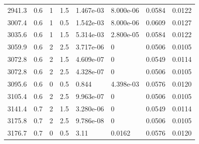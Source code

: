 \documentclass[preview]{standalone}
\begin{document}
{{{\begin{tabular}{L{1.2cm}C{1.2cm} C{0.3cm}C{0.5cm} C{1.4cm}C{1.4cm} C{1.4cm}C{1.4cm}}
  2941.3  &   0.6  & 1     & 1.5 &  1.467e-03  & 8.000e-06  & 0.0584 &  0.0122   \\ 
  3007.4  &   0.6  & 1     & 0.5 &  1.542e-03  & 8.000e-06  & 0.0609 &  0.0127   \\ 
  3035.6  &   0.6  & 1     & 1.5 &  5.314e-03  & 2.800e-05  & 0.0584 &  0.0122   \\ 
  3059.9  &   0.6  & 2     & 2.5 &  3.717e-06  & 0  & 0.0506 &  0.0105   \\ 
  3072.8  &   0.6  & 2     & 1.5 &  4.609e-07  & 0  & 0.0549 &  0.0114   \\ 
  3072.8  &   0.6  & 2     & 2.5 &  4.328e-07  & 0  & 0.0506 &  0.0105   \\ 
  3095.6  &   0.6  & 0     & 0.5 &  0.844  & 4.398e-03  & 0.0576 &  0.0120   \\ 
  3105.4  &   0.6  & 2     & 2.5 &  9.963e-07  & 0  & 0.0506 &  0.0105   \\ 
  3141.4  &   0.7  & 2     & 1.5 &  3.280e-06  & 0  & 0.0549 &  0.0114   \\ 
  3175.8  &   0.7  & 2     & 2.5 &  9.786e-08  & 0  & 0.0506 &  0.0105   \\ 
  3176.7  &   0.7  & 0     & 0.5 &  3.11  & 0.0162  & 0.0576 &  0.0120   \\ 
\hline 
\end{tabular} 

}}}
\end{document}
